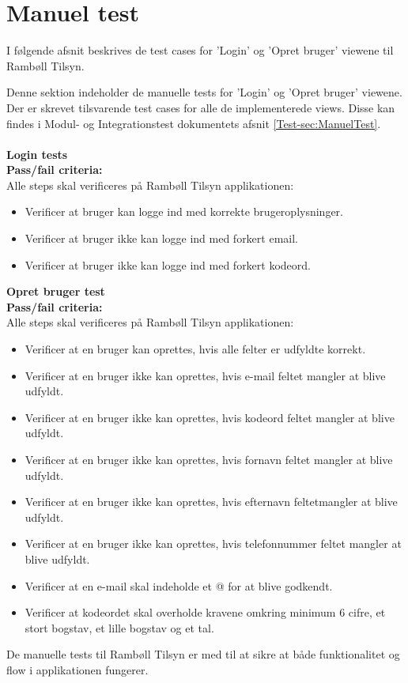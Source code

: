 \clearpage

\section{Manuel test}
I følgende afsnit beskrives de test cases for 'Login' og 'Opret bruger' viewene til Rambøll Tilsyn.

Denne sektion indeholder de manuelle tests for 'Login' og 'Opret bruger' viewene. Der er skrevet tilsvarende test cases for alle de implementerede views. Disse kan findes i Modul- og Integrationstest dokumentets afsnit \ref{Test-sec:ManuelTest}. \\ \\
\textbf{Login tests} \\
\textbf{Pass/fail criteria:} \\
Alle steps skal verificeres på Rambøll Tilsyn applikationen:
\begin{itemize}[-]
	\item Verificer at bruger kan logge ind med korrekte brugeroplysninger.
	\item Verificer at bruger ikke kan logge ind med forkert email.
	\item Verificer at bruger ikke kan logge ind med forkert kodeord. \\
\end{itemize}

\textbf{Opret bruger test} \\
\textbf{Pass/fail criteria:} \\
Alle steps skal verificeres på Rambøll Tilsyn applikationen:
\begin{itemize}[-]
	\item Verificer at en bruger kan oprettes, hvis alle felter er udfyldte korrekt.
	\item Verificer at en bruger ikke kan oprettes, hvis e-mail feltet mangler at blive udfyldt.
	\item Verificer at en bruger ikke kan oprettes, hvis kodeord feltet mangler at blive udfyldt.
	\item Verificer at en bruger ikke kan oprettes, hvis fornavn feltet mangler at blive udfyldt.
	\item Verificer at en bruger ikke kan oprettes, hvis efternavn feltetmangler at blive udfyldt.
	\item Verificer at en bruger ikke kan oprettes, hvis telefonnummer feltet mangler at blive udfyldt.
	\item Verificer at en e-mail skal indeholde et @ for at blive godkendt.
	\item Verificer at kodeordet skal overholde kravene omkring minimum 6 cifre, et stort bogstav, et lille bogstav og et tal.
\end{itemize}

De manuelle tests til Rambøll Tilsyn er med til at sikre at både funktionalitet og flow i applikationen fungerer.